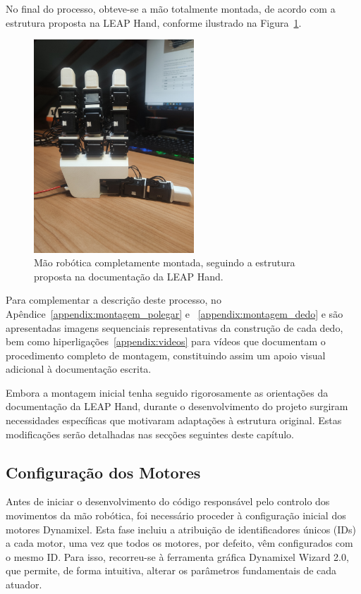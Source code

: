 No final do processo, obteve-se a mão totalmente montada, de acordo com a estrutura proposta na LEAP Hand, conforme ilustrado na Figura~\ref{fig:mao_montada}.

\begin{figure}[H]
    \centering
    \includegraphics[height=8cm]{figs/chapter4/leap.jpg}
    \caption{Mão robótica completamente montada, seguindo a estrutura proposta na documentação da LEAP Hand.}
    \label{fig:mao_montada}
    
\end{figure}

Para complementar a descrição deste processo, no Apêndice~\ref{appendix:montagem_polegar} e ~\ref{appendix:montagem_dedo} e  são apresentadas imagens sequenciais representativas da construção de cada dedo, bem como hiperligações~\ref{appendix:videos} para vídeos que documentam o procedimento completo de montagem, constituindo assim um apoio visual adicional à documentação escrita.



Embora a montagem inicial tenha seguido rigorosamente as orientações da documentação da LEAP Hand, durante o desenvolvimento do projeto surgiram necessidades específicas que motivaram adaptações à estrutura original. Estas modificações serão detalhadas nas secções seguintes deste capítulo.



\subsection{Configuração dos Motores}

Antes de iniciar o desenvolvimento do código responsável pelo controlo dos movimentos da mão robótica, foi necessário proceder à configuração inicial dos motores Dynamixel. Esta fase incluiu a atribuição de identificadores únicos (IDs) a cada motor, uma vez que todos os motores, por defeito, vêm configurados com o mesmo ID. Para isso, recorreu-se à ferramenta gráfica Dynamixel Wizard 2.0, que permite, de forma intuitiva, alterar os parâmetros fundamentais de cada atuador.

